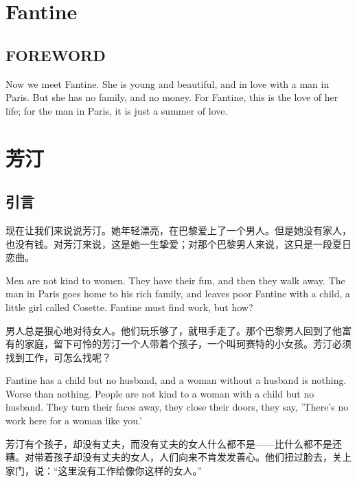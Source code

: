 \documentclass[fontset=ubuntu, zihao=5]{ctexart}
\begin{document}
\clearpage
\begin{paracol}{2}

  \section{Fantine}

  \subsection{FOREWORD}

  Now we meet Fantine. She is young and beautiful, and in love with a man in Paris. But she has no family, and no money. For Fantine, this is the love of her life; for the man in Paris, it is just a summer of love.

  \switchcolumn

  \section*{芳汀}

  \subsection*{引言}


  现在让我们来说说芳汀。她年轻漂亮，在巴黎爱上了一个男人。但是她没有家人，也没有钱。对芳汀来说，这是她一生挚爱；对那个巴黎男人来说，这只是一段夏日恋曲。

  \switchcolumn*

  Men are not kind to women. They have their fun, and then they walk away. The man in Paris goes home to his rich family, and leaves poor Fantine with a child, a little girl called Cosette. Fantine must find work, but how?

  \switchcolumn

  男人总是狠心地对待女人。他们玩乐够了，就甩手走了。那个巴黎男人回到了他富有的家庭，留下可怜的芳汀一个人带着个孩子，一个叫珂赛特的小女孩。芳汀必须找到工作，可怎么找呢？

  \switchcolumn*

  Fantine has a child but no husband, and a woman without a husband is nothing. Worse than nothing. People are not kind to a woman with a child but no husband. They turn their faces away, they close their doors, they say, 'There's no work here for a woman like you.'

  \switchcolumn

  芳汀有个孩子，却没有丈夫，而没有丈夫的女人什么都不是——比什么都不是还糟。对带着孩子却没有丈夫的女人，人们向来不肯发发善心。他们扭过脸去，关上家门，说：“这里没有工作给像你这样的女人。”


\end{paracol}
\end{document}
